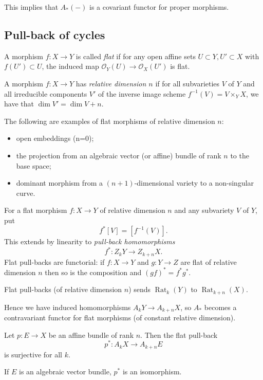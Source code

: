 \documentclass[a4paper,openany]{scrbook}
\DeclareMathOperator{\Rat}{Rat}
\begin{document}
This implies that $A_*(-)$ is a covariant functor for proper morphisms.

\subsection{Pull-back of cycles}

A morphism $f\colon X\to Y$ is called \emph{flat} if for any open affine sets $U\subset Y, U'\subset X$ with $f(U')\subset U$, the induced map $\mathcal O_Y(U)\to \mathcal O_X(U')$ is flat.

A morphism $f\colon X\to Y$ has \emph{relative dimension $n$} if for all subvarieties $V$ of $Y$ and all irreducible components $V'$ of the inverse image scheme $f^{-1}(V) = V \times_Y X$, we have that $\dim V' = \dim V +n$.

\begin{example}
 The following are examples of flat morphisms of relative dimension $n$:
 \begin{itemize}
  \item open embeddings (n=0);
  \item the projection from an algebraic vector (or affine) bundle of rank $n$ to the base space;
  \item dominant morphism from a $(n+1)$-dimensional variety to a non-singular curve.
 \end{itemize}
\end{example}

For a flat morphism $f\colon X\to Y$ of relative dimension $n$ and any subvariety $V$ of $Y$, put
\[
f^*[V]=[f^{-1}(V)].
\]
This extends by linearity to \emph{pull-back homomorphisms}
\[
f^*:Z_kY\to Z_{k+n}X.
\]
Flat pull-backs are functorial: if $f\colon X\to Y$ and $g\colon Y\to Z$ are flat of relative dimension $n$ then so is the composition and $(gf)^*=f^*g^*$. 

\begin{thm} 
Flat pull-backs (of relative dimension $n$) sends $\Rat_k(Y)$ to $\Rat_{k+n}(X)$.
\end{thm}

Hence we have induced homomorphisms $A_kY\to A_{k+n}X$, so $A_*$ becomes a contravariant functor for flat morphisms (of constant relative dimension).

\begin{thm} 
 Let $p\colon E\to X$ be an affine bundle of rank $n$. Then the flat pull-back
 \[
 p^*:A_kX\to A_{k+n}E
 \]
 is surjective for all $k$.

 If $E$ is an algebraic vector bundle, $p^*$ is an isomorphism.
\end{thm}
\end{document}
